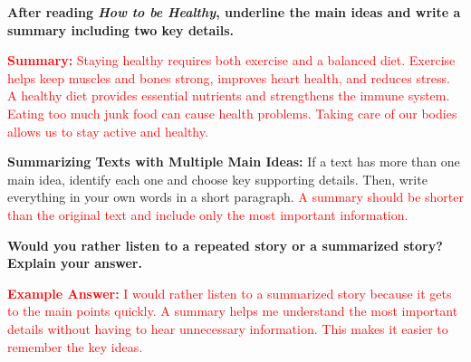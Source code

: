 \documentclass[12pt]{article}
\begin{document}
\vspace{1em}

\begin{tcolorbox}[colframe=black!60, colback=white, 
coltitle=black, colbacktitle=black!15, fonttitle=\bfseries\Large, 
title=Independent Practice, halign title=center, left=10pt, right=10pt, top=10pt, bottom=15pt]
\textbf{After reading \textit{How to be Healthy}, underline the main ideas and write a summary including two key details.}

\textcolor{red}{
\textbf{Summary:} Staying healthy requires both exercise and a balanced diet. Exercise helps keep muscles and bones strong, improves heart health, and reduces stress. A healthy diet provides essential nutrients and strengthens the immune system. Eating too much junk food can cause health problems. Taking care of our bodies allows us to stay active and healthy.}
\end{tcolorbox}

\vspace{1em}

\begin{tcolorbox}[colframe=black!40, colback=gray!5, 
coltitle=black, colbacktitle=black!20, fonttitle=\bfseries\Large, 
title=Additional Notes, halign title=center, left=5pt, right=5pt, top=5pt, bottom=15pt]
\textbf{Summarizing Texts with Multiple Main Ideas:}  
If a text has more than one main idea, identify each one and choose key supporting details. Then, write everything in your own words in a short paragraph.  
\textcolor{red}{A summary should be shorter than the original text and include only the most important information.}
\end{tcolorbox}

\vspace{1em}

\begin{tcolorbox}[colframe=black!60, colback=white, 
coltitle=black, colbacktitle=black!15, fonttitle=\bfseries\Large, 
title=Exit Ticket, halign title=center, left=10pt, right=10pt, top=10pt, bottom=15pt]
\textbf{Would you rather listen to a repeated story or a summarized story? Explain your answer.}  

\textcolor{red}{\textbf{Example Answer:} I would rather listen to a summarized story because it gets to the main points quickly. A summary helps me understand the most important details without having to hear unnecessary information. This makes it easier to remember the key ideas.}
\end{tcolorbox}
\end{document}
